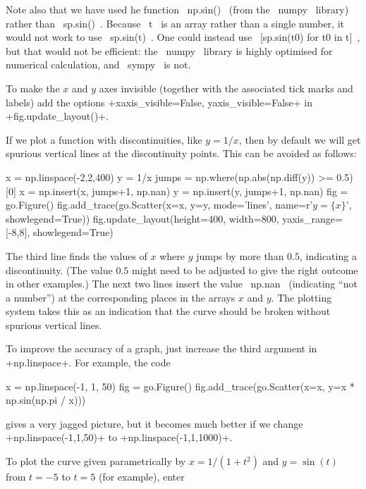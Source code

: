 \documentclass[a4paper,10pt]{amsbook}
\begin{document}
\begin{secenum}
  Note also that we have used he function \pcode~np.sin()~ (from the
  \pcode~numpy~ library) rather than \pcode~sp.sin()~.  Because
  \pcode~t~ is an array rather than a single number, it would not work
  to use \pcode~sp.sin(t)~.  One could instead use
  \pcode~[sp.sin(t0) for t0 in t]~, but that would not be efficient:
  the \pcode~numpy~ library is highly optimised for numerical
  calculation, and \pcode~sympy~ is not.
 \item\label{hideaxes} To make the $x$ and $y$ axes invisible (together with
  the associated tick marks and labels) add the options
  \pcode+xaxis_visible=False, yaxis_visible=False+ in
  \pcode+fig.update_layout()+. 
 \item\label{discont} If we plot a function with discontinuities, like
  $y=1/x$, then by default we will get spurious vertical lines at the
  discontinuity points.  This can be avoided as follows:
  \begin{pcodeblock}
   x = np.linspace(-2,2,400)
   y = 1/x
   jumps = np.where(np.abs(np.diff(y)) >= 0.5)[0]
   x = np.insert(x, jumps+1, np.nan)
   y = np.insert(y, jumps+1, np.nan)
   fig = go.Figure()
   fig.add_trace(go.Scatter(x=x, y=y, mode='lines', 
                            name=r'$y = \{x\}$', showlegend=True))
   fig.update_layout(height=400, width=800, yaxis_range=[-8,8], showlegend=True)   
  \end{pcodeblock}
  The third line finds the values of $x$ where $y$ jumps by more than
  $0.5$, indicating a discontinuity.  (The value $0.5$ might need to
  be adjusted to give the right outcome in other examples.)  The next
  two lines insert the value \pcode~np.nan~ (indicating ``not a
  number'') at the corresponding places in the arrays $x$ and $y$.
  The plotting system takes this as an indication that the curve
  should be broken without spurious vertical lines.
 \item\label{numpoints} To improve the accuracy of a graph, just increase
  the third argument in \pcode+np.linspace+.  For example, the code
  \begin{pcodeblock}
   x = np.linspace(-1, 1, 50)
   fig = go.Figure()
   fig.add_trace(go.Scatter(x=x, y=x * np.sin(np.pi / x)))
  \end{pcodeblock}
  gives a very jagged picture, but it becomes much better if we change 
  \pcode+np.linspace(-1,1,50)+ to \pcode+np.linspace(-1,1,1000)+.
%
 \item\label{parametric} To plot the curve given parametrically by
  $x=1/(1+t^2)$ and $y=\sin(t)$ from $t=-5$ to $t=5$ (for example), enter

\end{secenum}
\end{document}
